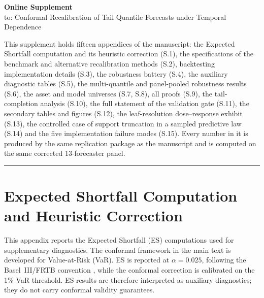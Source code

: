 \documentclass[preprint,11pt,authoryear]{elsarticle}
\newcommand{\1}{\boldsymbol{1}}
\begin{document}
\renewcommand{\thesection}{S.\arabic{section}}
\renewcommand{\thetable}{S.\arabic{table}}
\renewcommand{\thefigure}{S.\arabic{figure}}
\renewcommand{\theequation}{S.\arabic{equation}}
\setcounter{section}{0}
\setcounter{table}{0}
\setcounter{figure}{0}
\setcounter{equation}{0}

\begin{center}
	{\Large\bfseries Online Supplement}\\[4pt]
	{\large to: Conformal Recalibration of Tail Quantile Forecasts under
	Temporal Dependence}
\end{center}

\bigskip

\noindent
This supplement holds fifteen appendices of the manuscript: the Expected
Shortfall computation and its heuristic correction (S.1), the specifications of
the benchmark and alternative recalibration methods (S.2), backtesting
implementation details (S.3), the robustness battery (S.4), the auxiliary
diagnostic tables (S.5), the multi-quantile and panel-pooled robustness results
(S.6), the asset and model universes (S.7, S.8), all proofs (S.9), the
tail-completion analysis (S.10), the full statement of the validation gate
(S.11), the secondary tables and figures (S.12), the leaf-resolution
dose--response exhibit (S.13), the controlled case of support truncation in a
sampled predictive law (S.14) and the five implementation failure modes (S.15).
Every number in
it is produced by the same replication package as the manuscript and is computed
on the same corrected 13-forecaster panel.

\tableofcontents

\bigskip
\hrule
\bigskip

\section{Expected Shortfall Computation and Heuristic Correction}
\label{app:es}

This appendix reports the Expected Shortfall (ES) computations used for
supplementary diagnostics. The conformal framework in the main text is
developed for Value-at-Risk (VaR). ES is reported at $\alpha=0.025$,
following the Basel~III/FRTB convention \citep{bcbs2019frtb}, while the
conformal correction is calibrated on the 1\% VaR threshold. ES results are
therefore interpreted as auxiliary diagnostics; they do not carry conformal
validity guarantees.
\end{document}
